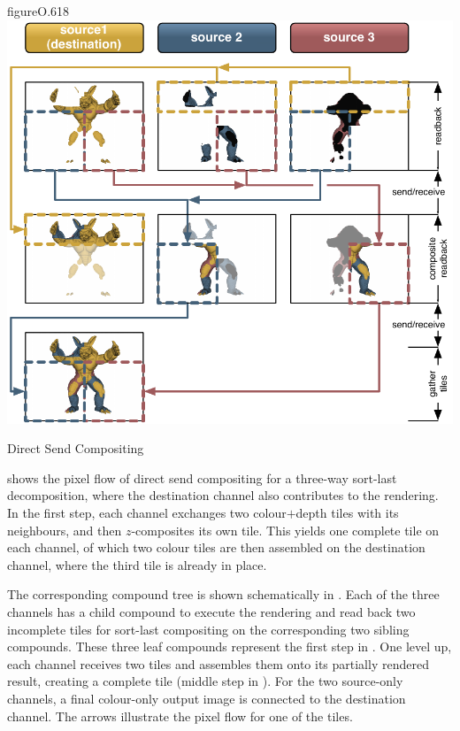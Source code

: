 \begin{wrapfloat}{figure}{O}{.618\textwidth}
  \includegraphics[width=.618\textwidth]{images/directSend}
  {\caption{\label{fDirectSend}Direct Send Compositing}}
\end{wrapfloat}

 shows the pixel flow of direct send compositing for a three-way
sort-last decomposition, where the destination channel also contributes to the
rendering. In the first step, each channel exchanges two colour$+$depth tiles with
its neighbours, and then $z$-composites its own tile. This yields one complete
tile on each channel, of which two colour tiles are then assembled on the
destination channel, where the third tile is already in place.

The corresponding compound tree is shown schematically in .
Each of the three channels has a child compound to execute the rendering and
read back two incomplete tiles for sort-last compositing on the corresponding
two sibling compounds. These three leaf compounds represent the first step in
. One level up, each channel receives two tiles and assembles
them onto its partially rendered result, creating a complete tile (middle step
in ). For the two source-only channels, a final colour-only
output image is connected to the destination channel. The arrows illustrate the
pixel flow for one of the tiles.

